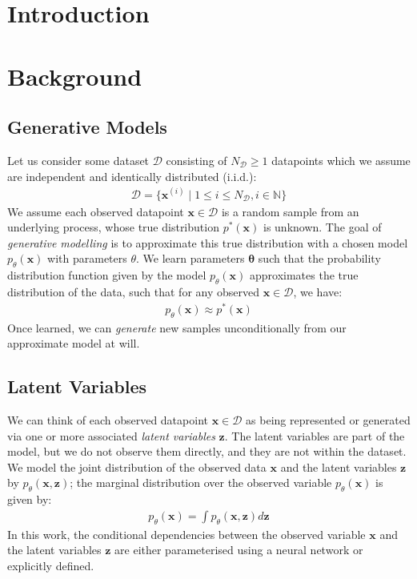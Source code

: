 \documentclass[ oneside,%
                    author={George Herbert},
                    degree={MSci},
                     title={Video Diffusion Models for Climate Simulations},
                  subtitle={}]{dissertation}
\begin{document}
\mainmatter


\chapter{Introduction}
\label{chap:introduction}

\chapter{Background}
\label{chap:background}

\section{Generative Models}
\label{sec:background_generative}

Let us consider some dataset $\mathcal{D}$ consisting of $N_{\mathcal{D}}\ge1$ datapoints which we assume are independent and identically distributed (i.i.d.):
\begin{align}
      \mathcal{D}=\{\mathbf{x}^{(i)}\mid 1 \le i \le N_{\mathcal{D}}, i \in \mathbb{N} \}
\end{align}
We assume each observed datapoint $\mathbf{x}\in\mathcal{D}$ is a random sample from an underlying process, whose true distribution $p^*(\mathbf{x})$ is unknown. The goal of \textit{generative modelling} is to approximate this true distribution with a chosen model $p_\theta(\mathbf{x})$ with parameters $\theta$. We learn parameters $\mathbf{\theta}$ such that the probability distribution function given by the model $p_\theta(\mathbf{x})$ approximates the true distribution of the data, such that for any observed $\mathbf{x}\in\mathcal{D}$, we have:
\begin{align}
      p_\theta(\mathbf{x}) \approx p^*(\mathbf{x})
\end{align}
Once learned, we can \textit{generate} new samples unconditionally from our approximate model at will.

\section{Latent Variables}
\label{sec:background_latent}

We can think of each observed datapoint $\mathbf{x}\in\mathcal{D}$ as being represented or generated via one or more associated \textit{latent variables} $\mathbf{z}$. The latent variables are part of the model, but we do not observe them directly, and they are not within the dataset. We model the joint distribution of the observed data $\mathbf{x}$ and the latent variables $\mathbf{z}$ by $p_\theta(\mathbf{x},\mathbf{z})$; the marginal distribution over the observed variable $p_\theta(\mathbf{x})$ is given by:
\begin{align}
      p_\theta(\mathbf{x})=\int p_\theta(\mathbf{x},\mathbf{z}) d\mathbf{z}
\end{align}
In this work, the conditional dependencies between the observed variable $\mathbf{x}$ and the latent variables $\mathbf{z}$ are either parameterised using a neural network or explicitly defined. 
\end{document}
